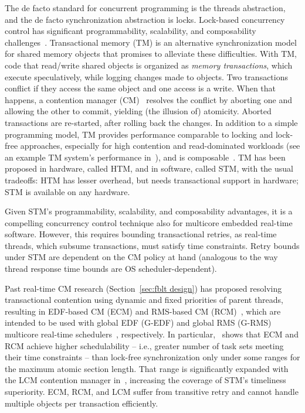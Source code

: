 \documentclass[prodmode,acmtecs]{acmsmall}
\begin{document}
The de facto standard for concurrent programming is the threads abstraction, and the 
de facto synchronization abstraction is locks. Lock-based concurrency control has significant programmability, scalability, and composability challenges~\cite{Herlihy:2006:AMP:1146381.1146382}. Transactional memory (TM) is an alternative synchronization model for shared memory objects that promises to alleviate these difficulties. With TM, code that read/write shared objects is organized as \textit{memory transactions}, which execute speculatively, while logging changes made to objects. Two transactions conflict if they access the same object and one access is a write. When that happens, a contention manager (CM)~\cite{Guerraoui:2005:TTT:1073814.1073863} resolves the conflict by aborting one and allowing the other to commit, yielding (the illusion of) atomicity. Aborted transactions are re-started, after rolling back the changes. In addition to a simple programming model, TM provides performance comparable to locking and lock-free approaches, especially for high contention and read-dominated workloads (see an example TM system's performance in~\cite{Saha:2006:MHP:1122971.1123001}), and is composable~\cite{Harris:2005:CMT:1065944.1065952}. TM has been proposed in hardware, called HTM, and in software, called STM, with the usual tradeoffs: HTM has lesser overhead, but needs transactional support in hardware; STM is available on any hardware.

Given STM's programmability, scalability, and composability advantages, it is a compelling concurrency control technique also for multicore embedded real-time software. However, this requires  bounding transactional  retries, as real-time threads, which subsume transactions, must satisfy time constraints.  Retry bounds under STM are dependent on the CM policy at hand (analogous to the way thread response time bounds are OS scheduler-dependent). 

Past real-time CM research (Section~\ref{sec:fblt design}) has proposed resolving transactional contention using dynamic and fixed priorities of parent threads, resulting in EDF-based CM (ECM) and RMS-based CM (RCM)~\cite{6045438,stmconcurrencycontrol:emsoft11,lcmdac2012}, which are intended to be used with global EDF (G-EDF) and global RMS (G-RMS) multicore real-time schedulers~\cite{Davis:2011:SHR:1978802.1978814}, respectively.
In particular,~\cite{stmconcurrencycontrol:emsoft11} shows that ECM and RCM achieve higher schedulability -- i.e., greater number of task sets meeting their time constraints -- than lock-free synchronization only under some ranges for the maximum atomic section length. That range is significantly expanded with the LCM contention manager in~\cite{lcmdac2012}, increasing the coverage of STM's timeliness superiority. ECM, RCM, and LCM suffer from transitive retry and cannot handle multiple objects per transaction efficiently. 
\end{document}
